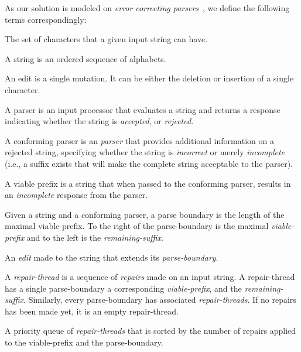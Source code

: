 \documentclass[acmsmall,screen,review,anonymous]{acmart}
\begin{document}
As our solution is modeled on \emph{error correcting parsers}~\cite{aho1972minimum},
we define the following terms correspondingly:
\begin{description}[labelwidth=!, labelindent=0pt]
\item[alphabet] The set of characters that a given input string can have.

\item[string] A string is an ordered sequence of alphabets.

\item[edit] An edit is a single mutation. It can be either the deletion
or insertion of a single character.

\item[parser] A parser is an input processor that evaluates a string and returns
a response indicating whether the string is \emph{accepted}, or \emph{rejected}.

\item[conforming parser] A conforming parser is an \emph{parser} that 
provides additional information on a rejected string, specifying whether
the string is \emph{incorrect} or merely \emph{incomplete} (i.e., a suffix exists that
will make the complete string acceptable to the parser).

\item[viable-prefix] A viable prefix is a string that when passed to the conforming parser,
 results in an \emph{incomplete} response from the parser.

\item[parse-boundary] Given a string and a conforming parser, a parse boundary is the
length of the maximal viable-prefix. To the right of the parse-boundary is the maximal
\emph{viable-prefix} and to the left is the \emph{remaining-suffix}.

\item[repair] An \emph{edit} made to the string that extends its \emph{parse-boundary}.

\item[repair-thread] A \emph{repair-thread} is a sequence of \emph{repairs} made on an
input string. A repair-thread has a single parse-boundary a corresponding
\emph{viable-prefix}, and the \emph{remaining-suffix}.
Similarly, every parse-boundary has associated \emph{repair-threads}.
If no repairs has been made yet, it is an empty repair-thread.

\item[thread-queue] A priority queue of \emph{repair-threads} that is sorted by the
number of repairs applied to the viable-prefix and the parse-boundary.
\end{description}
\end{document}
